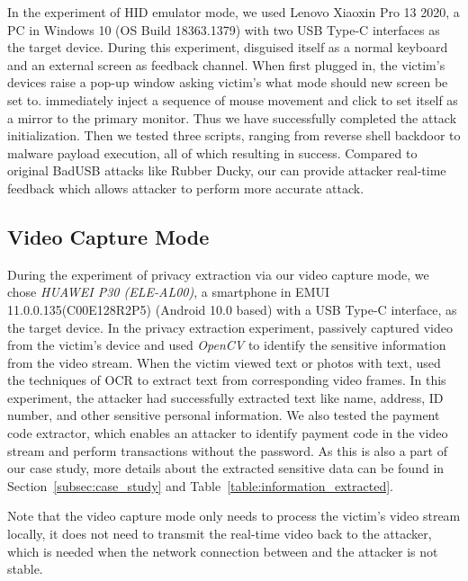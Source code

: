 In the experiment of HID emulator mode, we used {Lenovo Xiaoxin Pro 13
2020}, a PC in Windows 10 (OS Build 18363.1379) with two \ac{USB} Type-C interfaces as the
target device. During this experiment, \tool disguised itself as a normal keyboard and an external screen as feedback channel. When first plugged in, the victim's devices raise a pop-up window asking victim's what mode should new screen be set to. \tool immediately inject a sequence of mouse movement and click to set itself as a mirror to the primary monitor. Thus we have successfully completed the attack initialization. Then we tested three scripts, ranging from reverse shell backdoor to malware payload execution, all of which resulting in success. Compared to original BadUSB attacks like Rubber Ducky, our \tool can provide attacker real-time feedback which allows attacker to perform more accurate attack.


\subsection{Video Capture Mode}

During the experiment of privacy extraction via our video capture mode, we chose \textit{HUAWEI P30 (ELE-AL00)}, a
smartphone in EMUI 11.0.0.135(C00E128R2P5) (Android 10.0 based) with a \ac{USB} Type-C interface, as the
target device.  In the privacy extraction experiment, \tool passively captured video
from the victim's device and used \textit{OpenCV} to identify the sensitive
information from the video stream.  When the victim viewed text or photos with
text, \tool used the techniques of \ac{OCR}  to
extract text from corresponding video frames. In this experiment, the attacker had
successfully extracted text like name, address, ID number, and other sensitive
personal information. We also tested the payment code extractor, which enables
an attacker to identify payment code in the video stream and perform transactions
without the password. As this is also a part of our case study, more details about
the extracted sensitive data can be found in Section~\ref{subsec:case_study} and
Table~\ref{table:information_extracted}.

Note that the video capture mode only needs to
process the victim's video stream locally, it does not need to transmit the real-time video back to the attacker, which is needed when the network connection between \tool and the attacker is not stable.

